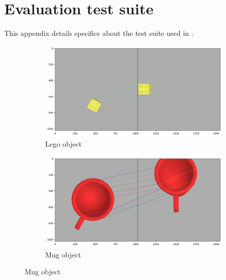 \chapter{Evaluation test suite}
\label{apx:test-suite}

This appendix details specifics about the test suite used in .\\

\begin{figure}[h]
    \centering
    \begin{subfigure}[b]{0.49\textwidth}
        \includegraphics[width=\textwidth]{figures/matchLego.png}
        \caption{Lego object}
    \end{subfigure}
    \hfill
    \begin{subfigure}[b]{0.49\textwidth}
        \includegraphics[width=\textwidth]{figures/matchMug.png}
        \caption{Mug object}
    \end{subfigure}


\end{figure}
